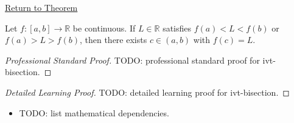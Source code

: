 \newpage
{}
\label{prf:ivt-bisection}

\begin{remark*}[Return]
\hyperref[prop:ivt-bisection]{Return to Theorem}
\end{remark*}

\begin{theorem*}
Let $f:[a,b]\to\mathbb{R}$ be continuous. If $L\in\mathbb{R}$ satisfies
$f(a)<L<f(b)$ or $f(a)>L>f(b)$, then there exists $c\in(a,b)$ with
$f(c)=L$.
\end{theorem*}

\begin{proof}[Professional Standard Proof]
\LRAProofBodyStart
TODO: professional standard proof for ivt-bisection.
\end{proof}

\begin{proof}[Detailed Learning Proof]
\LRAProofBodyStart
TODO: detailed learning proof for ivt-bisection.
\end{proof}

\begin{remark*}
\end{remark*}

\begin{dependencies}
\begin{itemize}
  \item TODO: list mathematical dependencies.
\end{itemize}
\end{dependencies}

\clearpage

